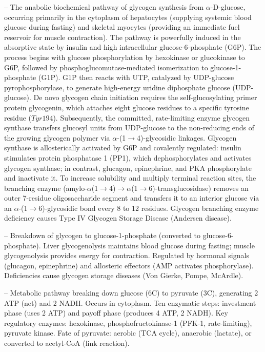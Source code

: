 -- The anabolic biochemical pathway of glycogen synthesis from $\alpha$-D-glucose, occurring primarily in the cytoplasm of hepatocytes (supplying systemic blood glucose during fasting) and skeletal myocytes (providing an immediate fuel reservoir for muscle contraction). The pathway is powerfully induced in the absorptive state by insulin and high intracellular glucose-6-phosphate (G6P). The process begins with glucose phosphorylation by hexokinase or glucokinase to G6P, followed by phosphoglucomutase-mediated isomerization to glucose-1-phosphate (G1P). G1P then reacts with UTP, catalyzed by UDP-glucose pyrophosphorylase, to generate high-energy uridine diphosphate glucose (UDP-glucose). De novo glycogen chain initiation requires the self-glucosylating primer protein glycogenin, which attaches eight glucose residues to a specific tyrosine residue ($Tyr194$). Subsequently, the committed, rate-limiting enzyme glycogen synthase transfers glucosyl units from UDP-glucose to the non-reducing ends of the growing glycogen polymer via $\alpha$-(1$\to$4)-glycosidic linkages. Glycogen synthase is allosterically activated by G6P and covalently regulated: insulin stimulates protein phosphatase 1 (PP1), which dephosphorylates and activates glycogen synthase; in contrast, glucagon, epinephrine, and PKA phosphorylate and inactivate it. To increase solubility and multiply terminal reaction sites, the branching enzyme (amylo-$\alpha$(1$\to$4)$\to$$\alpha$(1$\to$6)-transglucosidase) removes an outer 7-residue oligosaccharide segment and transfers it to an interior glucose via an $\alpha$-(1$\to$6)-glycosidic bond every 8 to 12 residues. Glycogen branching enzyme deficiency causes Type IV Glycogen Storage Disease (Andersen disease).

-- Breakdown of glycogen to glucose-1-phosphate (converted to glucose-6-phosphate). Liver glycogenolysis maintains blood glucose during fasting; muscle glycogenolysis provides energy for contraction. Regulated by hormonal signals (glucagon, epinephrine) and allosteric effectors (AMP activates phosphorylase). Deficiencies cause glycogen storage diseases (Von Gierke, Pompe, McArdle).

-- Metabolic pathway breaking down glucose (6C) to pyruvate (3C), generating 2 ATP (net) and 2 NADH. Occurs in cytoplasm. Ten enzymatic steps: investment phase (uses 2 ATP) and payoff phase (produces 4 ATP, 2 NADH). Key regulatory enzymes: hexokinase, phosphofructokinase-1 (PFK-1, rate-limiting), pyruvate kinase. Fate of pyruvate: aerobic (TCA cycle), anaerobic (lactate), or converted to acetyl-CoA (link reaction).

